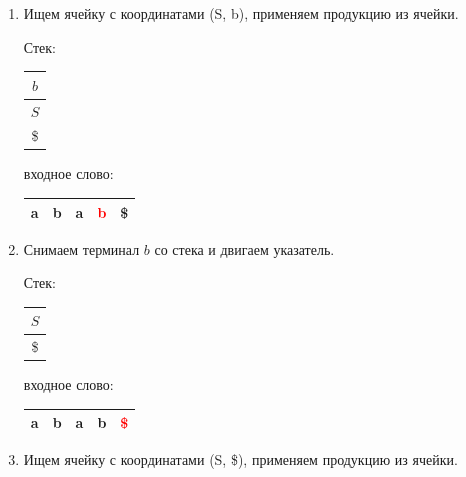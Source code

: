 \begin{example}
\begin{enumerate}
    \begin{center}
      \resizebox{6cm}{3.5cm}{
    
    }
  \end{center}

\item Ищем ячейку с координатами (S, b), применяем продукцию из ячейки.

    Стек: \,
    \begin{tabular}[c]{ |c| }
        \\ \hline
        $b$ \\ \hline
        $S$ \\ \hline
        \$ \\ \hline
    \end{tabular}
    \qquad  \qquad \qquad  \qquad входное слово: \,
    \begin{tabular}[c]{ |c|c|c|c|c| }
        \hline
        a & b & a & \textcolor{red}{b} & \$ \\ \hline
    \end{tabular}

    \begin{center}
      \resizebox{6cm}{3.5cm}{
    
    }
  \end{center}

\item Снимаем терминал $b$ со стека и двигаем указатель.

    Стек: \,
    \begin{tabular}[c]{ |c| }
        \\ \hline
        $S$ \\ \hline
        \$ \\ \hline
    \end{tabular}
    \qquad  \qquad \qquad  \qquad входное слово: \,
    \begin{tabular}[c]{ |c|c|c|c|c| }
        \hline
        a & b & a & b & \textcolor{red}{\$} \\ \hline
    \end{tabular}

    \begin{center}
      \resizebox{6cm}{3.5cm}{
      
    }
  \end{center}

\item Ищем ячейку с координатами (S, \$), применяем продукцию из ячейки.


\end{enumerate}
\end{example}

